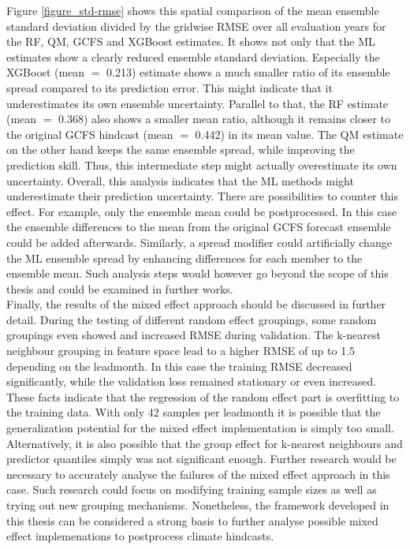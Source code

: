 \documentclass[ba-lentz.tex]{subfile}
\begin{document}
Figure \ref{figure_std-rmse} shows this spatial comparison of the mean ensemble standard deviation divided by the gridwise RMSE over all evaluation years for the RF, QM, GCFS and XGBoost estimates.
It shows not only that the ML estimates show a clearly reduced ensemble standard deviation.
Especially the XGBoost (mean $=$ 0.213) estimate shows a much smaller ratio of its ensemble spread compared to its prediction error.
This might indicate that it underestimates its own ensemble uncertainty.
Parallel to that, the RF estimate (mean $=$ 0.368) also shows a smaller mean ratio, although it remains closer to the original GCFS hindcast (mean $=$ 0.442) in its mean value.
The QM estimate on the other hand keeps the same ensemble spread, while improving the prediction skill.
Thus, this intermediate step might actually overestimate its own uncertainty.
Overall, this analysis indicates that the ML methods might underestimate their prediction uncertainty.
There are possibilities to counter this effect.
For example, only the ensemble mean could be postprocessed.
In this case the ensemble differences to the mean from the original GCFS forecast ensemble could be added afterwards.
Similarly, a spread modifier could artificially change the ML ensemble spread by enhancing differences for each member to the ensemble mean.
Such analysis steps would however go beyond the scope of this thesis and could be examined in further works. \\
Finally, the results of the mixed effect approach should be discussed in further detail.
During the testing of different random effect groupings, some random groupings even showed and increased RMSE during validation.
The k-nearest neighbour grouping in feature space lead to a higher RMSE of up to 1.5 depending on the leadmonth.
In this case the training RMSE decreased significantly, while the validation loss remained stationary or even increased.
These facts indicate that the regression of the random effect part is overfitting to the training data.
With only 42 samples per leadmonth it is possible that the generalization potential for the mixed effect implementation is simply too small.
Alternatively, it is also possible that the group effect for k-nearest neighbours and predictor quantiles simply was not significant enough.
Further research would be necessary to accurately analyse the failures of the mixed effect approach in this case.
Such research could focus on modifying training sample sizes as well as trying out new grouping mechanisms.
Nonetheless, the framework developed in this thesis can be considered a strong basis to further analyse possible mixed effect implemenations to postprocess climate hindcasts.
\end{document}
